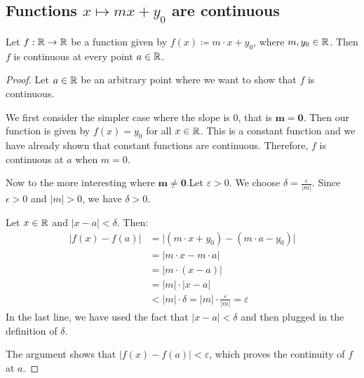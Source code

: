 \subsection{Functions $x \mapsto mx + y_0$ are continuous}

\begin{theorem}
   Let $f: \mathbb{R} \to \mathbb{R}$ be a function given by $f(x) \coloneqq m \cdot x + y_0$, where $m, y_0 \in \mathbb{R}$. Then $f$ is continuous at every point $a \in \mathbb{R}$.
\end{theorem}

\begin{proof}
   Let $a \in \mathbb{R}$ be an arbitrary point where we want to show that $f$ is continuous.

   We first consider the simpler case where the slope is $0$, that is $\mathbf{m = 0}$. Then our function is given by $f(x) = y_0$ for all $x \in \mathbb{R}$. This is a constant function and we have already shown that constant functions are continuous. Therefore, $f$ is continuous at $a$ when $m = 0$.

   Now to the more interesting where $\mathbf{m \neq 0}$.Let $\varepsilon > 0$. We choose $\delta = \frac{\varepsilon}{|m|}$. Since $\epsilon > 0$ and $|m| > 0$, we have $\delta > 0$.

   Let $x \in \mathbb{R}$ and $|x-a| < \delta$. Then:
   \begin{align*}
      |f(x) - f(a)| &= \bigl|(m \cdot x + y_0) - (m \cdot a - y_0)\bigr| \\
      &= |m \cdot x - m \cdot a| \\
      &= |m \cdot (x - a)| \\
      &= |m| \cdot |x - a| \\
      &< |m| \cdot \delta
      = |m| \cdot \frac{\varepsilon}{|m|} = \varepsilon
   \end{align*}
   In the last line, we have used the fact that $|x - a| < \delta$ and then plugged in the definition of $\delta$.

   The argument shows that $|f(x) - f(a)| < \varepsilon$, which proves the continuity of $f$ at $a$.
\end{proof}
